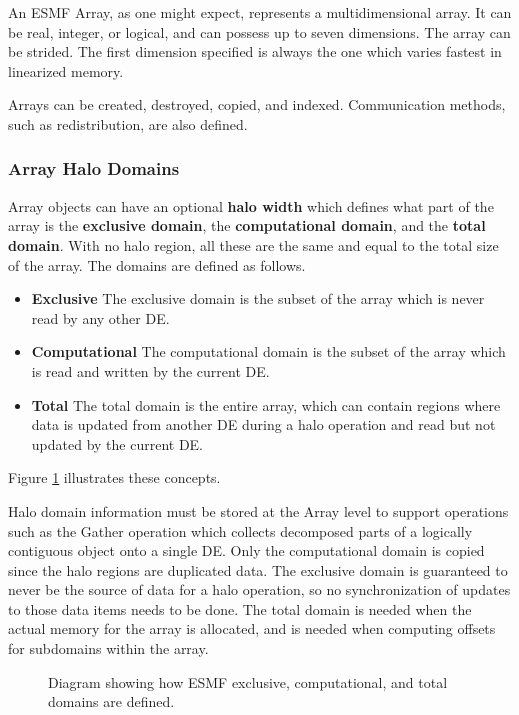 

An ESMF Array, as one might expect, represents a multidimensional array.
It can be real, integer, or logical, and can possess up to seven 
dimensions.  The array can be strided.  The first dimension specified 
is always the one which varies fastest in linearized memory. 

Arrays can be created, destroyed, copied, and indexed.  Communication
methods, such as redistribution, are also defined.

\subsubsection{Array Halo Domains}

Array objects can have an optional {\bf halo width} which defines
what part of the array is the {\bf exclusive domain}, the {\bf computational
domain}, and the {\bf total domain}.  With no halo region, all these are
the same and equal to the total size of the array.  The domains are
defined as follows.

\begin{itemize}

\item {\bf Exclusive}  The exclusive domain is the subset of the
array which is never read by any other DE.  

\item {\bf Computational}  The computational domain
is the subset of the array which is read and written by the current 
DE.

\item {\bf Total}  The total domain is the entire array, which can 
contain regions where data is updated from another DE during a 
halo operation and read but not updated by the current DE.  

\end{itemize}

Figure \ref{fig:halo} illustrates these concepts.

Halo domain information must be stored at the Array level to
support operations such as the Gather operation which collects
decomposed parts of a logically contiguous object onto a single DE.
Only the computational domain is copied since the halo regions are
duplicated data.  The exclusive domain is guaranteed to never be
the source of data for a halo operation, so no synchronization
of updates to those data items needs to be done.  The total
domain is needed when the actual memory for the array is allocated,
and is needed when computing offsets for subdomains within the array.

\begin{center}
\begin{figure}
\caption{Diagram showing how ESMF exclusive, computational,
and total domains are defined.  }
\label{fig:halo}
\end{figure}
\end{center}









